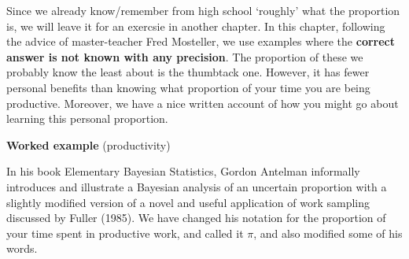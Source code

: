 \documentclass[]{book}
\begin{document}
Since we already know/remember from high school `roughly' what the proportion is, we will leave it for an exercsie in another chapter. In this chapter, following the advice of master-teacher Fred Mosteller, we use examples where the \textbf{correct answer is not known with any precision}. The proportion of these we probably know the least about is the thumbtack one. However, it has fewer personal benefits than knowing what proportion of your time you are being productive. Moreover, we have a nice written account of how you might go about learning this personal proportion.

\textbf{Worked example} (productivity)

In his book Elementary Bayesian Statistics, Gordon Antelman informally introduces and illustrate a Bayesian analysis of an uncertain proportion with a slightly modified version of a novel and useful application of work sampling discussed by Fuller (1985). We have changed his notation for the proportion of your time spent in productive work, and called it \(\pi\), and also modified some of his words.
\end{document}
